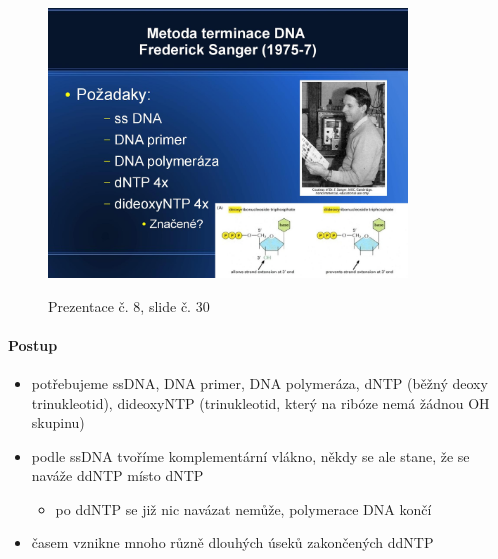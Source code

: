 \documentclass[DIV=8]{scrreprt}
\begin{document}
\begin{figure}
    \caption{Prezentace č. 8, slide č. 30}
    \includegraphics[width=0.85\textwidth]{slides-8/slide-30.jpg}
    \centering
    \label{slides-8-slide-30}
\end{figure}

\paragraph{Postup}
\begin{itemize}[nosep]
    \item potřebujeme ssDNA, DNA primer, DNA polymeráza, dNTP (běžný deoxy trinukleotid), dideoxyNTP (trinukleotid, který na ribóze nemá žádnou OH skupinu)
    \item podle ssDNA tvoříme komplementární vlákno, někdy se ale stane, že se naváže ddNTP místo dNTP
\begin{itemize}[nosep]
    \item po ddNTP se již nic navázat nemůže, polymerace DNA končí
\end{itemize}

    \item časem vznikne mnoho různě dlouhých úseků zakončených ddNTP
\end{itemize}
\end{document}
